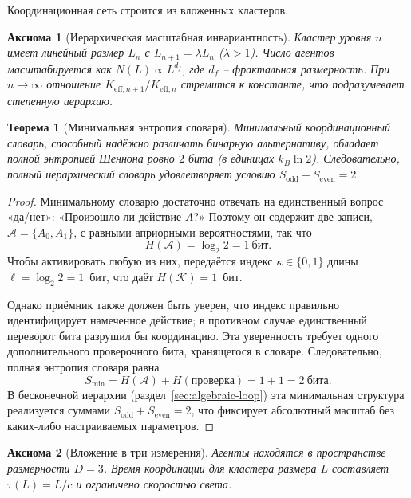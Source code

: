 \documentclass[11pt,a4paper]{article}
\newtheorem{axiom}{Аксиома}
\newtheorem{theorem}{Теорема}[section]
\begin{document}
	Координационная сеть строится из вложенных кластеров.
	
	\begin{axiom}[Иерархическая масштабная инвариантность] \label{ax:A1}
		Кластер уровня \(n\) имеет линейный размер \(L_n\) с \(L_{n+1} = \lambda L_n\) (\(\lambda > 1\)).  Число агентов масштабируется как \(N(L) \propto L^{d_f}\), где \(d_f\) – фрактальная размерность.  При \(n \to \infty\) отношение \(K_{\mathrm{eff},n+1}/K_{\mathrm{eff},n}\) стремится к константе, что подразумевает степенную иерархию.
	\end{axiom}
	
	\begin{theorem}[Минимальная энтропия словаря]
		\label{thm:minimal-dict}
		Минимальный координационный словарь, способный надёжно различать бинарную альтернативу, обладает полной энтропией Шеннона ровно \(2\) бита (в единицах \(k_B\ln 2\)).  Следовательно, полный иерархический словарь удовлетворяет условию \(S_{\mathrm{odd}} + S_{\mathrm{even}} = 2\).
	\end{theorem}
	
	\begin{proof}
		Минимальному словарю достаточно отвечать на единственный вопрос «да/нет»: «Произошло ли действие \(A\)?»  Поэтому он содержит две записи, \(\mathcal{A} = \{A_0, A_1\}\), с равными априорными вероятностями, так что
		\[
		H(\mathcal{A}) = \log_2 2 = 1\ \text{бит}.
		\]
		Чтобы активировать любую из них, передаётся индекс \(\kappa \in \{0,1\}\) длины \(\ell = \log_2 2 = 1\)~бит, что даёт \(H(\mathcal{K}) = 1\)~бит.
		
		Однако приёмник также должен быть уверен, что индекс правильно идентифицирует намеченное действие; в противном случае единственный переворот бита разрушил бы координацию.  Эта уверенность требует одного дополнительного проверочного бита, хранящегося в словаре.  Следовательно, полная энтропия словаря равна
		\[
		S_{\min} = H(\mathcal{A}) + H(\text{проверка}) = 1 + 1 = 2\ \text{бита}.
		\]
		В бесконечной иерархии (раздел~\ref{sec:algebraic-loop}) эта минимальная структура реализуется суммами \(S_{\mathrm{odd}} + S_{\mathrm{even}} = 2\), что фиксирует абсолютный масштаб без каких-либо настраиваемых параметров.
	\end{proof}
	
	\begin{axiom}[Вложение в три измерения] \label{ax:A3}
		Агенты находятся в пространстве размерности \(D = 3\).  Время координации для кластера размера \(L\) составляет \(\tau(L) = L/c\) и ограничено скоростью света.
	\end{axiom}
	
\end{document}
